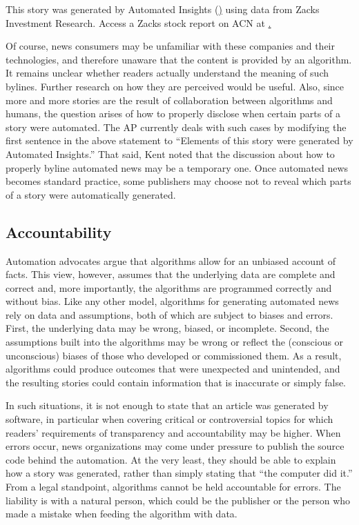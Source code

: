 \documentclass[notoc, symmetric, nobib, nols]{towcenter-guideto-book}
\begin{document}
This story was generated by Automated Insights (\href{http://automatedinsights.com/ap}) using data from Zacks Investment Research. Access a Zacks stock report on ACN at \href{http://www.zacks.com/ap/ACN}. 

Of course, news consumers may be unfamiliar with these companies and their technologies, and therefore unaware that the content is provided by an algorithm. It remains unclear whether readers actually understand the meaning of such bylines. Further research on how they are perceived would be useful. Also, since more and more stories are the result of collaboration between algorithms and humans, the question arises of how to properly disclose when certain parts of a story were automated. The AP currently deals with such cases by modifying the first sentence in the above statement to ``Elements of this story were generated by Automated Insights.''\autocite{ap15-3} That said, Kent noted that the discussion about how to properly byline automated news may be a temporary one. Once automated news becomes standard practice, some publishers may choose not to reveal which parts of a story were automatically generated.
 
\subsection{Accountability}

Automation advocates argue that algorithms allow for an unbiased account of facts. This view, however, assumes that the underlying data are complete and correct and, more importantly, the algorithms are programmed correctly and without bias. Like any other model, algorithms for generating automated news rely on data and assumptions, both of which are subject to biases and errors.\autocite{lazer14} First, the underlying data may be wrong, biased, or incomplete. Second, the assumptions built into the algorithms may be wrong or reflect the (conscious or unconscious) biases of those who developed or commissioned them. As a result, algorithms could produce outcomes that were unexpected and unintended, and the resulting stories could contain information that is inaccurate or simply false.\autocites{diak15, diak152} 
 
In such situations, it is not enough to state that an article was generated by software, in particular when covering critical or controversial topics for which readers' requirements of transparency and accountability may be higher. When errors occur, news organizations may come under pressure to publish the source code behind the automation. At the very least, they should be able to explain how a story was generated, rather than simply stating that ``the computer did it.''\autocite{kent15} From a legal standpoint, algorithms cannot be held accountable for errors. The liability is with a natural person, which could be the publisher or the person who made a mistake when feeding the algorithm with data.\autocites{weeks14, ombelet15}
\end{document}
